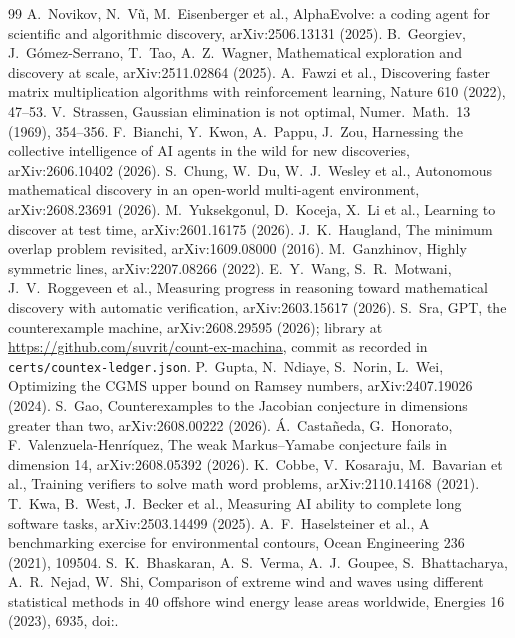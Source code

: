 \documentclass[11pt]{article}
\theoremstyle{plain}
\theoremstyle{definition}
\begin{document}
\begin{thebibliography}{99}\scriptsize\setlength{\itemsep}{1pt}
 A.~Novikov, N.~V\~u, M.~Eisenberger et al., AlphaEvolve: a coding agent for scientific and algorithmic discovery, arXiv:2506.13131 (2025).
 B.~Georgiev, J.~G\'omez-Serrano, T.~Tao, A.~Z.~Wagner, Mathematical exploration and discovery at scale, arXiv:2511.02864 (2025).
 A.~Fawzi et al., Discovering faster matrix multiplication algorithms with reinforcement learning, Nature 610 (2022), 47--53.
 V.~Strassen, Gaussian elimination is not optimal, Numer.\ Math.\ 13 (1969), 354--356.
 F.~Bianchi, Y.~Kwon, A.~Pappu, J.~Zou, Harnessing the collective intelligence of AI agents in the wild for new discoveries, arXiv:2606.10402 (2026).
 S.~Chung, W.~Du, W.~J.~Wesley et al., Autonomous mathematical discovery in an open-world multi-agent environment, arXiv:2608.23691 (2026).
 M.~Yuksekgonul, D.~Koceja, X.~Li et al., Learning to discover at test time, arXiv:2601.16175 (2026).
 J.~K.~Haugland, The minimum overlap problem revisited, arXiv:1609.08000 (2016).
 M.~Ganzhinov, Highly symmetric lines, arXiv:2207.08266 (2022).
 E.~Y.~Wang, S.~R.~Motwani, J.~V.~Roggeveen et al., Measuring progress in reasoning toward mathematical discovery with automatic verification, arXiv:2603.15617 (2026).
 S.~Sra, GPT, the counterexample machine, arXiv:2608.29595 (2026); library at \url{https://github.com/suvrit/count-ex-machina}, commit \CxCommit{} as recorded in \texttt{certs/countex-ledger.json}.
 P.~Gupta, N.~Ndiaye, S.~Norin, L.~Wei, Optimizing the CGMS upper bound on Ramsey numbers, arXiv:2407.19026 (2024).
 S.~Gao, Counterexamples to the Jacobian conjecture in dimensions greater than two, arXiv:2608.00222 (2026).
 \'A.~Casta\~neda, G.~Honorato, F.~Valenzuela-Henr\'iquez, The weak Markus--Yamabe conjecture fails in dimension 14, arXiv:2608.05392 (2026).
 K.~Cobbe, V.~Kosaraju, M.~Bavarian et al., Training verifiers to solve math word problems, arXiv:2110.14168 (2021).
 T.~Kwa, B.~West, J.~Becker et al., Measuring AI ability to complete long software tasks, arXiv:2503.14499 (2025).
 A.~F.~Haselsteiner et al., A benchmarking exercise for environmental contours, Ocean Engineering 236 (2021), 109504.
 S.~K.~Bhaskaran, A.~S.~Verma, A.~J.~Goupee, S.~Bhattacharya, A.~R.~Nejad, W.~Shi, Comparison of extreme wind and waves using different statistical methods in 40 offshore wind energy lease areas worldwide, Energies 16 (2023), 6935, doi:\DtDoi.

\end{thebibliography}
\end{document}
